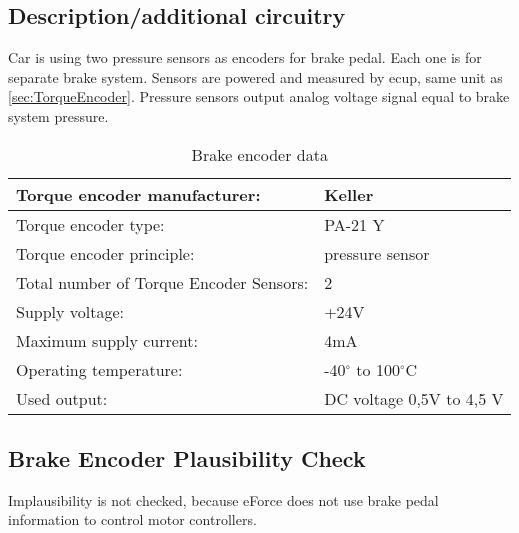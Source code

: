 \subsection{Description/additional circuitry}
Car is using two pressure sensors as encoders for brake pedal. Each one is for separate brake system. Sensors are powered and measured by \gls{ecup}, same unit as \ref{sec:TorqueEncoder}. Pressure sensors output analog voltage signal equal to brake system pressure. 


\begin{table}[H]
	\centering
	\caption{Brake encoder data}
	\begin{tabularx}{\textwidth}{|X|X|}
		\hline
		Torque encoder manufacturer: &  Keller \\[\TableSize]\hline
		Torque encoder type: & PA-21 Y \\[\TableSize]\hline
		Torque encoder principle: & pressure sensor \\[\TableSize]\hline
		Total number of Torque Encoder Sensors: & 2 \\[\TableSize]\hline
		Supply voltage: & +24V \\[\TableSize]\hline
		Maximum supply current: &  4mA  \\[\TableSize]\hline
		Operating temperature: & -40$^\circ$ to 100$^\circ$C \\[\TableSize]\hline
		Used output: & DC voltage 0,5V to 4,5 V \\[\TableSize]\hline
	\end{tabularx}%
	\label{tab:brake-general}%
\end{table}%

\subsection{Brake Encoder Plausibility Check}
Implausibility is not checked, because eForce does not use brake pedal information to control motor controllers.

%
%




